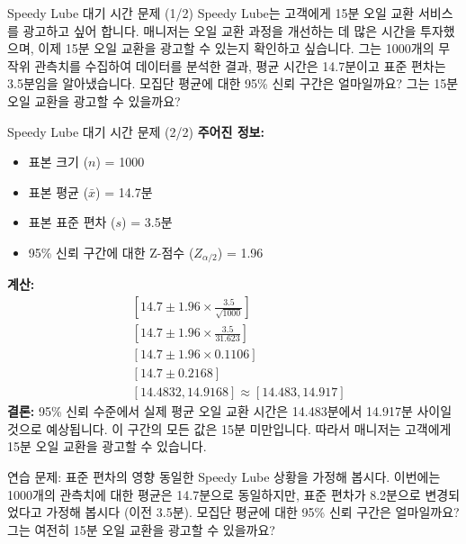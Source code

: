 \documentclass[11pt,a4paper]{article}
\begin{document}
\begin{examplebox}{Speedy Lube 대기 시간 문제 (1/2)}
Speedy Lube는 고객에게 15분 오일 교환 서비스를 광고하고 싶어 합니다.
매니저는 오일 교환 과정을 개선하는 데 많은 시간을 투자했으며, 이제 15분 오일 교환을 광고할 수 있는지 확인하고 싶습니다.
그는 1000개의 무작위 관측치를 수집하여 데이터를 분석한 결과, 평균 시간은 14.7분이고 표준 편차는 3.5분임을 알아냈습니다.
모집단 평균에 대한 95\% 신뢰 구간은 얼마일까요? 그는 15분 오일 교환을 광고할 수 있을까요?
\end{examplebox}

\begin{examplebox}{Speedy Lube 대기 시간 문제 (2/2)}
\textbf{주어진 정보:}
\begin{itemize}
    \item 표본 크기 ($n$) = 1000
    \item 표본 평균 ($\bar{x}$) = 14.7분
    \item 표본 표준 편차 ($s$) = 3.5분
    \item 95\% 신뢰 구간에 대한 Z-점수 ($Z_{\alpha/2}$) = 1.96
\end{itemize}
\textbf{계산:}
\begin{align*}
    & [14.7 \pm 1.96 \times \frac{3.5}{\sqrt{1000}}] \\
    & [14.7 \pm 1.96 \times \frac{3.5}{31.623}] \\
    & [14.7 \pm 1.96 \times 0.1106] \\
    & [14.7 \pm 0.2168] \\
    & [14.4832, 14.9168] \approx [14.483, 14.917]
\end{align*}
\textbf{결론:}
95\% 신뢰 수준에서 실제 평균 오일 교환 시간은 14.483분에서 14.917분 사이일 것으로 예상됩니다. 이 구간의 모든 값은 15분 미만입니다.
따라서 매니저는 고객에게 15분 오일 교환을 광고할 수 있습니다.
\end{examplebox}

\begin{examplebox}{연습 문제: 표준 편차의 영향}
동일한 Speedy Lube 상황을 가정해 봅시다.
이번에는 1000개의 관측치에 대한 평균은 14.7분으로 동일하지만, 표준 편차가 8.2분으로 변경되었다고 가정해 봅시다 (이전 3.5분).
모집단 평균에 대한 95\% 신뢰 구간은 얼마일까요? 그는 여전히 15분 오일 교환을 광고할 수 있을까요?
\end{examplebox}
\end{document}
